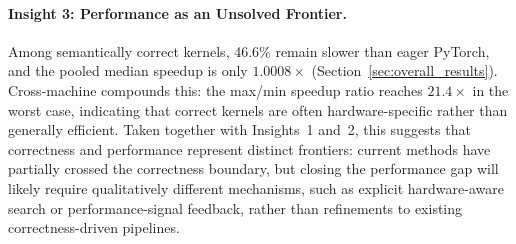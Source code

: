 \paragraph{Insight 3: Performance as an Unsolved Frontier.}
Among semantically correct kernels, 46.6\% remain slower than eager PyTorch, and the pooled median speedup is only $1.0008\times$ (Section~\ref{sec:overall_results}). 
Cross-machine compounds this: the max/min speedup ratio reaches $21.4\times$ in the worst case, indicating that correct kernels are often hardware-specific rather than generally efficient.
Taken together with Insights~1 and~2, this suggests that correctness and performance represent distinct frontiers: current methods have partially crossed the correctness boundary, but closing the performance gap will likely require qualitatively different mechanisms, such as explicit hardware-aware search or performance-signal feedback, rather than refinements to existing correctness-driven pipelines.

